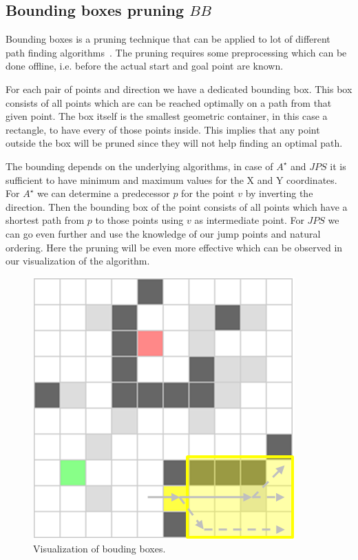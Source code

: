 \documentclass{article}
\begin{document}
    
    
    \subsection{Bounding boxes pruning $BB$}
    
    Bounding boxes is a pruning technique that can be applied to lot of different path finding algorithms~\cite{DBLP:conf/aaai/RabinS16}. The pruning requires some preprocessing which can be done offline, i.e. before the actual start and goal point are known.
    
    For each pair of points and direction we have a dedicated bounding box. This box consists of all points which are can be reached optimally on a path from that given point. The box itself is the smallest geometric container, in this case a rectangle, to have every of those points inside. This implies that any point outside the box will be pruned since they will not help finding an optimal path.
    
    The bounding depends on the underlying algorithms, in case of $A^\star$ and $JPS$ it is sufficient to have minimum and maximum values for the X and Y coordinates. For $A^\star$ we can determine a predecessor $p$ for the point $v$ by inverting the direction. Then the bounding box of the point consists of all points which have a shortest path from $p$ to those points using $v$ as intermediate point. For $JPS$ we can go even further and use the knowledge of our jump points and natural ordering. Here the pruning will be even more effective which can be observed in our visualization of the algorithm.
    
    \begin{figure}[!htb]
        \centering
        \includegraphics{figures/bounding_boxes.png}
        \caption{Visualization of bouding boxes.}
        \label{fig:bounding_boxes}
    \end{figure}
    
\end{document}
